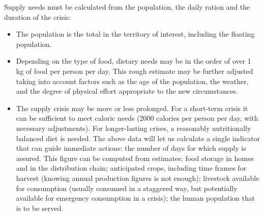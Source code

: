 \documentclass[12pt, a4]{scrartcl}
\begin{document}
Supply needs must be calculated from the population, the daily ration and the duration of the crisis:
\begin{itemize}
	\item The population is the total in the territory of interest, including the floating population.
	\item Depending on the type of food, dietary needs may be in the order of over 1 kg of food per person per day. This rough estimate may be further adjusted taking into account factors such as the age of the population, the weather, and the degree of physical effort appropriate to the new circumstances.
	\item The supply crisis may be more or less prolonged. For a short-term crisis it can be sufficient to meet caloric needs (2000 calories per person per day, with necessary adjustments). For longer-lasting crises, a reasonably nutritionally balanced diet is needed. The above data will let us calculate a single indicator that can guide immediate actions: the number of days for which supply is assured. This figure can be computed from estimates: food storage in homes and in the distribution chain; anticipated crops, including time frames for harvest (knowing annual production figures is not enough); livestock available for consumption (usually consumed in a staggered way, but potentially available for emergency consumption in a crisis); the human population that is to be served.
\end{itemize}
\end{document}
